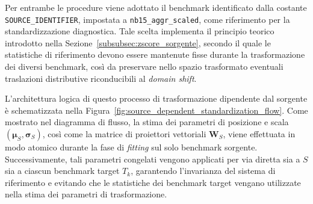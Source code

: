 Per entrambe le procedure viene adottato il benchmark identificato dalla costante \newline \texttt{SOURCE\_IDENTIFIER}, impostata a \texttt{nb15\_aggr\_scaled}, come riferimento per la standardizzazione diagnostica. 
Tale scelta implementa il principio teorico introdotto nella Sezione~\ref{subsubsec:zscore_sorgente}, secondo il quale le statistiche di riferimento devono essere mantenute fisse durante la trasformazione dei diversi benchmark, così da preservare nello spazio trasformato eventuali traslazioni distributive riconducibili al \textit{domain shift}.

L'architettura logica di questo processo di trasformazione dipendente dal sorgente è schematizzata nella Figura~\ref{fig:source_dependent_standardization_flow}. 
Come mostrato nel diagramma di flusso, la stima dei parametri di posizione e scala $(\boldsymbol{\mu}_S, \boldsymbol{\sigma}_S)$, così come la matrice di proiettori vettoriali $\mathbf{W}_S$, viene effettuata in modo atomico durante la fase di \textit{fitting} sul solo benchmark sorgente. 
Successivamente, tali parametri congelati vengono applicati per via diretta sia a $S$ sia a ciascun benchmark target $T_k$, garantendo l'invarianza del sistema di riferimento e evitando che le statistiche dei benchmark target vengano utilizzate nella stima dei parametri di trasformazione.

